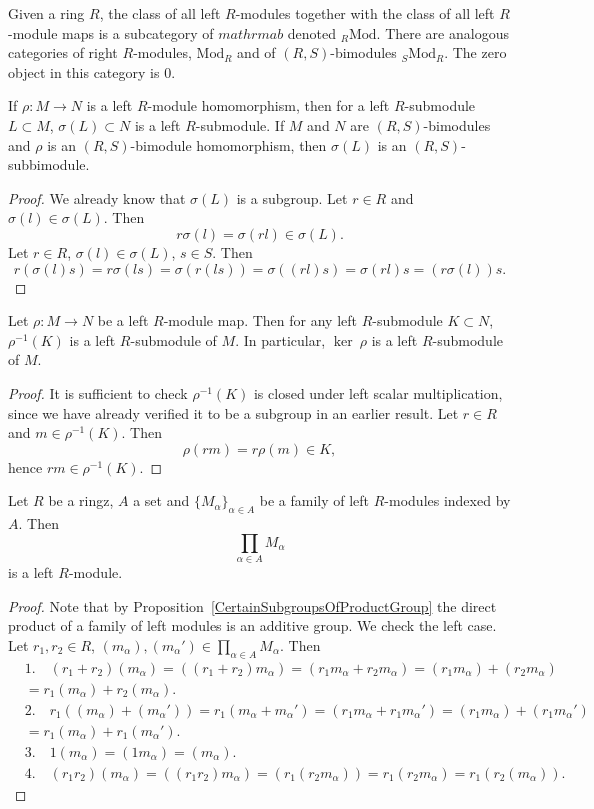 \begin{remark}
    Given a ring $R$, the class of all left $R$-modules together with the class of all left $R$-module maps is a subcategory of $mathrm{ab}$ denoted $_R\mathrm{Mod}$. There are analogous categories of right $R$-modules, $\mathrm{Mod}_R$ and of $(R,S)$-bimodules $_S\mathrm{Mod}_R$. The zero object in this category is $0$.
\end{remark}
\begin{lemma}
    If $\rho : M\rightarrow  N$ is a left $R$-module homomorphism, then for a left $R$-submodule $L\subset M$, $\sigma(L)\subset N$ is a left $R$-submodule. If $M$ and $N$ are $(R,S)$-bimodules and $\rho$ is an $(R,S)$-bimodule homomorphism, then $\sigma(L)$ is an $(R,S)$-subbimodule. 
\end{lemma}
\begin{proof}
    We already know that $\sigma(L)$ is a subgroup. Let $r\in R$ and $\sigma(l)\in\sigma(L)$. Then
    $$r\sigma(l)=\sigma(rl) \in \sigma(L).$$
    Let $r\in R$, $\sigma(l)\in \sigma(L)$, $s\in S$. Then 
    $$r(\sigma(l)s)= r\sigma(ls)= \sigma(r(ls)) = \sigma((rl)s) = \sigma(rl)s=(r\sigma(l))s.$$
\end{proof}
\begin{lemma}
    Let $\rho : M\rightarrow N$ be a left $R$-module map. Then for any left $R$-submodule $K\subset N$, $\rho^{-1}(K)$ is a left $R$-submodule of $M$. In particular, $\ker \ \rho$ is a left $R$-submodule of $M$.
\end{lemma}
\begin{proof}
    It is sufficient to check $\rho^{-1}(K)$ is closed under left scalar multiplication, since we have already verified it to be a subgroup in an earlier result. Let $r\in R$ and $m\in \rho^{-1}(K)$. Then 
    $$
        \rho(rm)= r\rho(m)\in K, 
    $$
    hence $rm\in \rho^{-1}(K)$.
\end{proof}
\begin{lemma}
    Let $R$ be a ringz, $A$ a set and $\{M_\alpha\}_{\alpha\in A}$ be a family of left $R$-modules indexed by $A$. Then 
    $$\prod_{\alpha\in A} M_\alpha$$
    is a left $R$-module.
\end{lemma}
\begin{proof}
    Note that by Proposition~\ref{CertainSubgroupsOfProductGroup} the direct product of a family of left modules is an additive group. We check the left case. Let $r_1,r_2\in R$, $(m_\alpha),(m_\alpha')\in \prod_{\alpha \in A} M_\alpha$. Then 
    \begin{align*}
        &1. \quad (r_1+r_2)(m_\alpha)=((r_1+r_2)m_\alpha)=(r_1m_\alpha+ r_2m_\alpha)=(r_1m_\alpha)+(r_2m_\alpha)\\
        &=r_1(m_\alpha)+r_2(m_\alpha).\\
        &2. \quad r_1((m_\alpha)+(m_\alpha')) = r_1(m_\alpha+m_\alpha')=(r_1m_\alpha+r_1m_\alpha')=(r_1m_\alpha)+(r_1m_\alpha')\\ &=r_1(m_\alpha)+r_1(m_\alpha').\\
        &3. \quad 1(m_\alpha) = (1m_\alpha)=(m_\alpha).\\
        &4. \quad (r_1r_2)(m_\alpha)=((r_1r_2)m_\alpha)=(r_1(r_2m_\alpha))=r_1(r_2m_\alpha)=r_1(r_2(m_\alpha)).
    \end{align*}
\end{proof}
